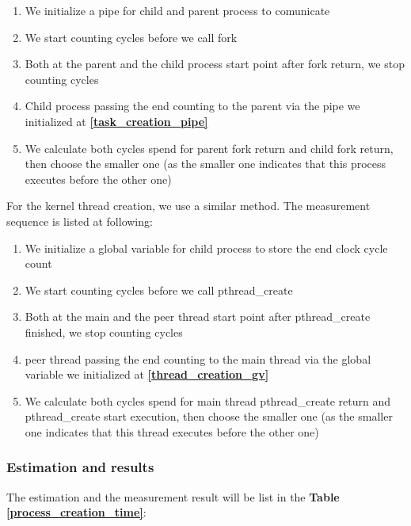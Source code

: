 \begin{enumerate}
    \item We initialize a pipe for child and parent process to comunicate \label{task_creation_pipe}
    \item We start counting cycles before we call fork
    \item Both at the parent and the child process start point after fork return, we stop counting cycles
    \item Child process passing the end counting to the parent via the pipe we initialized at \textbf{\ref{task_creation_pipe}}
    \item We calculate both cycles spend for parent fork return and child fork return, then choose the smaller one (as the smaller one indicates that this process executes before the other one)
\end{enumerate}

For the kernel thread creation, we use a similar method. The measurement sequence is listed at following:
\begin{enumerate}
    \item We initialize a global variable for child process to store the end clock cycle count \label{thread_creation_gv}
    \item We start counting cycles before we call pthread\_create
    \item Both at the main and the peer thread start point after pthread\_create finished, we stop counting cycles
    \item peer thread passing the end counting to the main thread via the global variable we initialized at \textbf{\ref{thread_creation_gv}}
    \item We calculate both cycles spend for main thread pthread\_create return and pthread\_create start execution, then choose the smaller one (as the smaller one indicates that this thread executes before the other one)
\end{enumerate}

\subsubsection{Estimation and results}

The estimation and the measurement result will be list in the \textbf{Table \ref{process_creation_time}}:

